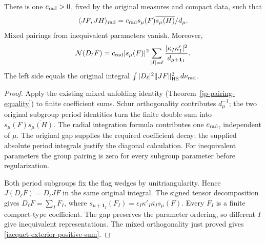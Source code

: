 \begin{proposition}\label{jacquet-exterior-exact-gram}
There is one $c_{\rm rad}>0$, fixed by the original measures and
compact data, such that
\[
 \langle JF,JH\rangle_{\rm rad}
 =c_{\rm rad}s_\mu(F)\overline{s_\mu(H)}/d_\mu.
\]
Mixed pairings from inequivalent parameters vanish. Moreover,
\begin{equation}\label{jacquet-exterior-positive-sum}
 \mathcal N(D_\ell F)
 =c_{\rm rad}|s_\mu(F)|^2
       \sum_{|I|=\ell}\frac{|\kappa_I\kappa'_I|^2}
                            {d_{\mu+\mathbf1_I}}.
\end{equation}
The left side equals the original integral
$\int|D_\ell|^2\|JF\|_{\rm HS}^2\,d\nu_{\rm rad}$.
\end{proposition}
\begin{proof}
Apply the existing mixed unfolding identity
(Theorem~\ref{jp-pairing-equality}) to finite coefficient sums.
Schur orthogonality contributes $d_\mu^{-1}$; the two original
subgroup period identities turn the finite double sum into
$s_\mu(F)\overline{s_\mu(H)}$. The radial integration formula
contributes one $c_{\rm rad}$, independent of $\mu$.
The original gap supplies the required coefficient decay;
the supplied absolute period integrals justify the diagonal
calculation. For inequivalent parameters the group pairing is
zero for every subgroup parameter before regularization.

Both period subgroups fix the flag wedges by unitriangularity.
Hence $J(D_\ell F)=D_\ell JF$ in the same original integral.
The signed tensor decomposition gives $D_\ell F=\sum_I F_I$,
where
$s_{\mu+\mathbf1_I}(F_I)
 =\epsilon_I\kappa'_I\overline{\kappa_I}s_\mu(F)$.
Every $F_I$ is a finite compact-type coefficient. The gap
preserves the parameter ordering, so different $I$ give
inequivalent representations. The mixed orthogonality just
proved gives \eqref{jacquet-exterior-positive-sum}.
\end{proof}

